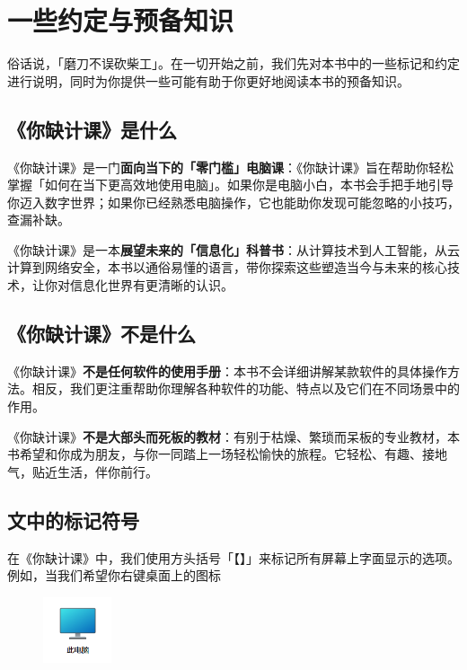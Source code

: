 \setcounter{chapter}{-1}

\chapter{一些约定与预备知识}
\label{first-things-first}

俗话说，「磨刀不误砍柴工」。在一切开始之前，我们先对本书中的一些标记和约定进行说明，同时为你提供一些可能有助于你更好地阅读本书的预备知识。

\section{《你缺计课》是什么}

《你缺计课》是一门\textbf{面向当下的「零门槛」电脑课}：《你缺计课》旨在帮助你轻松掌握「如何在当下更高效地使用电脑」。如果你是电脑小白，本书会手把手地引导你迈入数字世界；如果你已经熟悉电脑操作，它也能助你发现可能忽略的小技巧，查漏补缺。

《你缺计课》是一本\textbf{展望未来的「信息化」科普书}：从计算技术到人工智能，从云计算到网络安全，本书以通俗易懂的语言，带你探索这些塑造当今与未来的核心技术，让你对信息化世界有更清晰的认识。

\section{《你缺计课》不是什么}

《你缺计课》\textbf{不是任何软件的使用手册}：本书不会详细讲解某款软件的具体操作方法。相反，我们更注重帮助你理解各种软件的功能、特点以及它们在不同场景中的作用。

《你缺计课》\textbf{不是大部头而死板的教材}：有别于枯燥、繁琐而呆板的专业教材，本书希望和你成为朋友，与你一同踏上一场轻松愉快的旅程。它轻松、有趣、接地气，贴近生活，伴你前行。

\section{文中的标记符号}

在《你缺计课》中，我们使用方头括号「【】」来标记所有屏幕上字面显示的选项。例如，当我们希望你右键桌面上的图标
\begin{figure}[htb!]
  \centering
  \includegraphics[width=2cm]{assets/basic/This_PC.png}
\end{figure}

